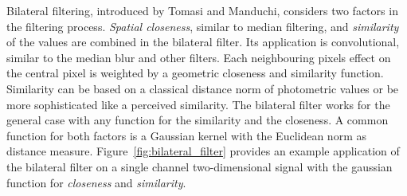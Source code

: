 Bilateral filtering, introduced by Tomasi and Manduchi\cite{tomasi_iccv98}, considers two factors in the filtering process.
\emph{Spatial closeness}, similar to median filtering, and \emph{similarity} of the values are combined in the bilateral filter.
Its application is convolutional, similar to the median blur and other filters.
Each neighbouring pixels effect on the central pixel is weighted by a geometric closeness and similarity function.
Similarity can be based on a classical distance norm of photometric values or be more sophisticated like a perceived similarity.
The bilateral filter works for the general case with any function for the similarity and the closeness.
A common function for both factors is a Gaussian kernel with the Euclidean norm as distance measure.
Figure~\ref{fig:bilateral_filter} provides an example application of the bilateral filter on a single channel two-dimensional signal with the gaussian function for \emph{closeness} and \emph{similarity}.
